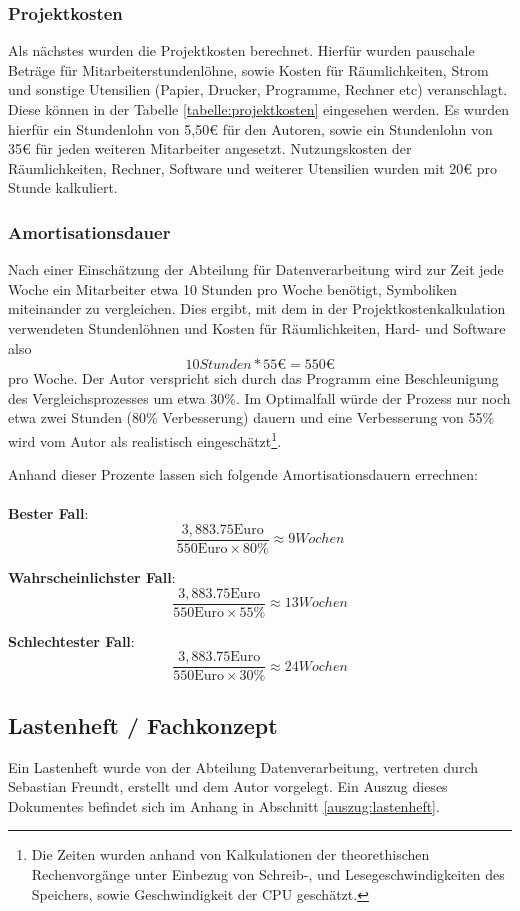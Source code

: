 \subsubsection{Projektkosten}
Als nächstes wurden die Projektkosten berechnet. Hierfür wurden pauschale Beträge 
für Mitarbeiterstundenlöhne, sowie Kosten für Räumlichkeiten, Strom und sonstige Utensilien 
(Papier, Drucker, Programme, Rechner etc) veranschlagt. Diese können in der Tabelle 
\ref{tabelle:projektkosten} eingesehen werden. Es wurden hierfür ein Stundenlohn von 5,50€ für den
Autoren, sowie ein Stundenlohn von 35€ für jeden weiteren Mitarbeiter angesetzt. Nutzungskosten 
der Räumlichkeiten, Rechner, Software und weiterer Utensilien wurden mit 20€ pro Stunde kalkuliert. \par


\subsubsection{Amortisationsdauer}
Nach einer Einschätzung der Abteilung für Datenverarbeitung wird zur Zeit jede Woche ein Mitarbeiter etwa 10 Stunden pro Woche benötigt, Symboliken miteinander zu vergleichen. Dies ergibt, mit dem in der Projektkostenkalkulation verwendeten
Stundenlöhnen und Kosten für Räumlichkeiten, Hard- und Software also \[10 Stunden*55€ = 550€\] pro Woche.
Der Autor verspricht sich durch das Programm eine Beschleunigung des Vergleichsprozesses um etwa 30\%. Im Optimalfall würde der Prozess nur noch etwa zwei Stunden (80\% Verbesserung) dauern und eine Verbesserung von 55\% wird vom Autor als realistisch eingeschätzt\footnote{Die Zeiten wurden anhand von Kalkulationen der theorethischen Rechenvorgänge unter Einbezug von Schreib-, und Lesegeschwindigkeiten des Speichers, sowie Geschwindigkeit der CPU geschätzt.}.

Anhand dieser Prozente lassen sich folgende Amortisationsdauern errechnen:\\
\\

    \textbf{Bester Fall}:
    \[\frac{3,883.75\text{Euro}}{550\text{Euro} \times 80\text{\%}} \approx 9 Wochen\]

    \textbf{Wahrscheinlichster Fall}:
    \[\frac{3,883.75\text{Euro}}{550\text{Euro} \times 55\text{\%}} \approx 13 Wochen\]

    \textbf{Schlechtester Fall}:
    \[\frac{3,883.75\text{Euro}}{550\text{Euro} \times 30\text{\%}} \approx 24 Wochen\]


\subsection{Lastenheft / Fachkonzept}
Ein Lastenheft wurde von der Abteilung Datenverarbeitung, vertreten durch Sebastian Freundt,
erstellt und dem Autor vorgelegt. Ein Auszug dieses Dokumentes befindet sich im Anhang in Abschnitt \ref{auszug:lastenheft}.\par




\clearpage